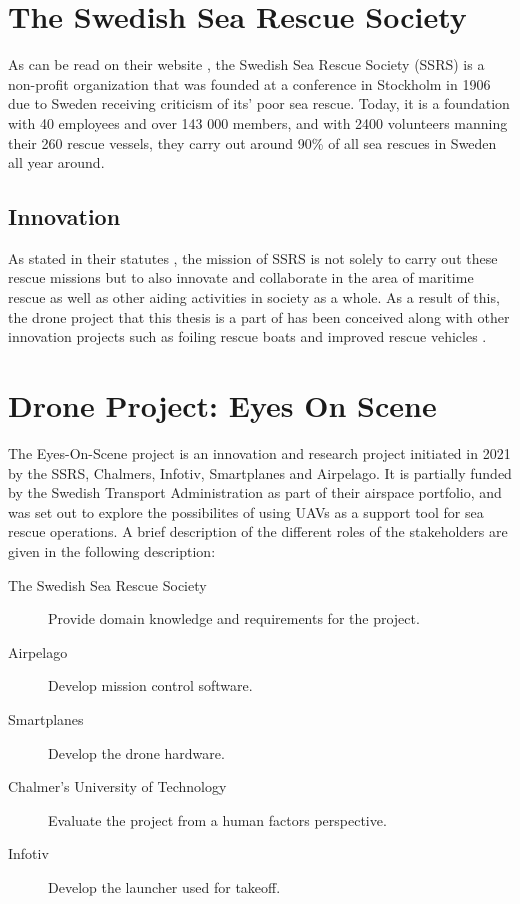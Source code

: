 \documentclass[nofilelist]{cslthse-msc}
\begin{document}
\section{The Swedish Sea Rescue Society}
As can be read on their website \cite{ssrs}, the Swedish Sea Rescue Society (SSRS) is a non-profit organization that was founded at a conference in Stockholm in 1906 due to Sweden receiving criticism of its' poor sea rescue. Today, it is a foundation with 40 employees and over 143 000 members, and with 2400 volunteers manning their 260 rescue vessels, they carry out around 90\% of all sea rescues in Sweden all year around.

\subsection{Innovation}
As stated in their statutes \cite{ssrs-statues}, the mission of SSRS is not solely to carry out these rescue missions but to also innovate and collaborate in the area of maritime rescue as well as other aiding activities in society as a whole. As a result of this, the drone project that this thesis is a part of has been conceived along with other innovation projects such as foiling rescue boats and improved rescue vehicles \cite{surtsey-innovation}.

\section{Drone Project: Eyes On Scene}
The Eyes-On-Scene project is an innovation and research project initiated in 2021 by the SSRS, Chalmers, Infotiv, Smartplanes and Airpelago. It is partially funded by the Swedish Transport Administration as part of their airspace portfolio, and was set out to explore the possibilites of using UAVs as a support tool for sea rescue operations. A brief description of the different roles of the stakeholders are given in the following description:

\begin{description}
   \item[The Swedish Sea Rescue Society] Provide domain knowledge and requirements for the project. 
   \item[Airpelago] Develop mission control software.
   \item[Smartplanes] Develop the drone hardware.
   \item[Chalmer's University of Technology] Evaluate the project from a human factors perspective.
   \item[Infotiv] Develop the launcher used for takeoff.
\end{description}
\end{document}

